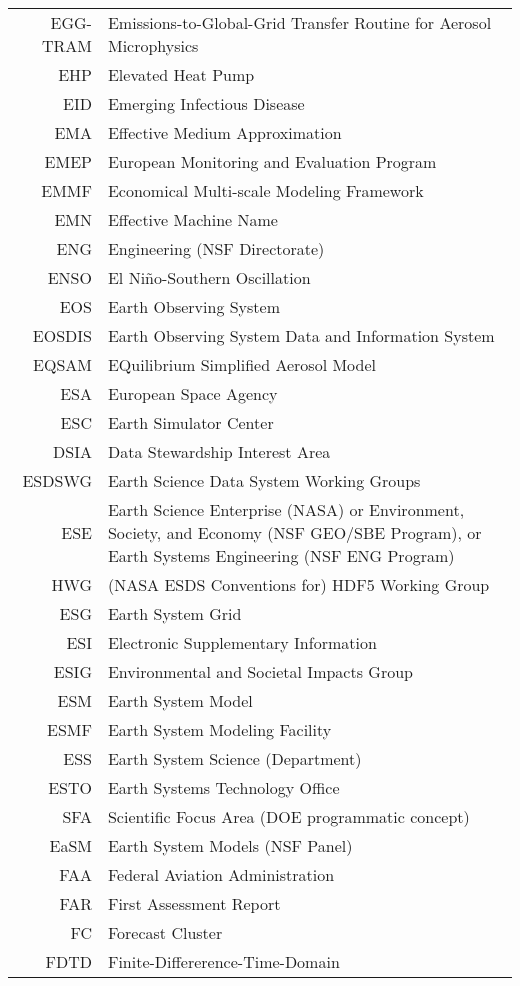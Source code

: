 \documentclass[12pt,twoside]{article}
\begin{document}
\begin{longtable}[>{\bfseries}l]{>{\ttfamily}r l}
EGG-TRAM & Emissions-to-Global-Grid Transfer Routine for Aerosol Microphysics \\
EHP & Elevated Heat Pump \\
EID & Emerging Infectious Disease \\
EMA & Effective Medium Approximation \\
EMEP & European Monitoring and Evaluation Program \\
EMMF & Economical Multi-scale Modeling Framework \\
EMN & Effective Machine Name \\
ENG & Engineering (NSF Directorate) \\
ENSO & El Ni\~no-Southern Oscillation \\
EOS & Earth Observing System \\
EOSDIS & Earth Observing System Data and Information System \\
EQSAM & EQuilibrium Simplified Aerosol Model \\
ESA & European Space Agency \\
ESC & Earth Simulator Center \\
DSIA & Data Stewardship Interest Area \\
ESDSWG & Earth Science Data System Working Groups \\
ESE & Earth Science Enterprise (NASA) or Environment, Society, and Economy (NSF GEO/SBE Program), or Earth Systems Engineering (NSF ENG Program) \\
HWG & (NASA ESDS Conventions for) HDF5 Working Group \\
ESG & Earth System Grid \\
ESI & Electronic Supplementary Information \\
ESIG & Environmental and Societal Impacts Group \\
ESM & Earth System Model \\
ESMF & Earth System Modeling Facility \\
ESS & Earth System Science (Department) \\
ESTO & Earth Systems Technology Office \\
SFA & Scientific Focus Area (DOE programmatic concept) \\
EaSM & Earth System Models (NSF Panel) \\
FAA & Federal Aviation Administration \\
FAR & First Assessment Report \\
FC & Forecast Cluster \\
FDTD & Finite-Differerence-Time-Domain \\

\end{longtable}
\end{document}
